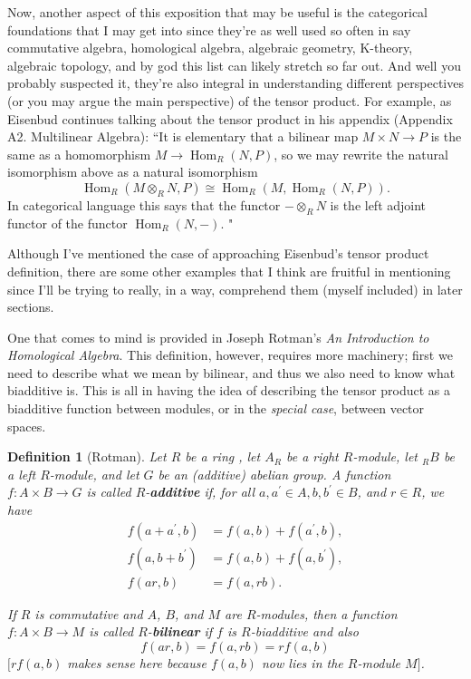 \documentclass[12pt,reqno]{amsart}
\theoremstyle{plain}
\newtheorem{defi}{Definition}
\DeclareMathOperator{\Hom}{Hom}
\begin{document}
Now, another aspect of this exposition that may be useful is the categorical foundations that I may get into since they're as well used so often in say commutative algebra, homological algebra, algebraic geometry, K-theory, algebraic topology, and by god this list can likely stretch so far out. And well you probably suspected it, they're also integral in understanding different perspectives (or you may argue the main perspective) of the tensor product. For example, as Eisenbud continues talking about the tensor product in his appendix (Appendix A2. Multilinear Algebra): ``It is elementary that a bilinear map $M \times N \to P$ is the same as a homomorphism $M \to \Hom_R (N, P)$, so we may rewrite the natural isomorphism above as a natural isomorphism 
$$ \Hom_R (M \otimes_R N, P) \cong \Hom_R (M, \Hom_R (N, P)).$$
In categorical language this says that the functor $- \otimes_R N$ is the left adjoint functor of the functor $\Hom_R (N,  -)$. "

Although I've mentioned the case of approaching Eisenbud's tensor product definition, there are some other examples that I think are fruitful in mentioning since I'll be trying to really, in a way, comprehend them (myself included) in later sections. 


One that comes to mind is provided in Joseph Rotman's \textit{An Introduction to Homological Algebra}. This definition, however, requires more machinery; first we need to describe what we mean by bilinear, and thus we also need to know what biadditive is.  This is all in having the idea of describing the tensor product as a biadditive function between modules, or in the \textit{special case}, between vector spaces. 
\begin{defi}[Rotman] Let $R$ be a ring , let $A_R$ be a right $R$-module, let $_R B$ be a left $R$-module, and let $G$ be an (additive) abelian group. A function $f \colon A \times B \to G$ is called $R$-\textbf{additive} if, for all $a, a^{\prime} \in A, b, b^{\prime} \in B$, and $r \in R$, we have 
\begin{align*}
f(a+a^{\prime}, b) &= f(a, b) + f(a^{\prime}, b), \\
f(a, b+b^{\prime}) &= f(a, b)+ f(a, b^{\prime}), \\
f(ar, b) &= f(a, rb).
\end{align*}

If $R$ is \textit{commutative} and $A$, $B$, and $M$ are $R$-modules, then a function $f \colon A \times B \to M$ is called $R$-\textbf{bilinear} if $f$ is $R$-biadditive and also
$$f (ar, b) = f(a, rb) = r f(a, b)$$
$[rf(a, b)$ makes sense here because $f(a, b)$ now lies in the $R$-module $M]$. 
\end{defi} 
\end{document}

